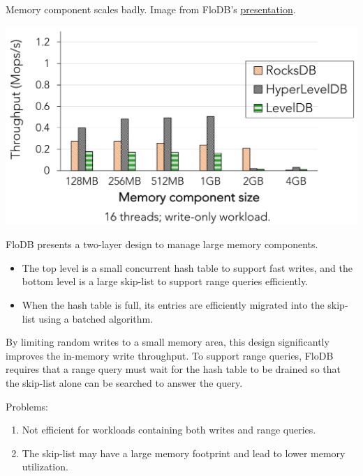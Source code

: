 \documentclass[11pt]{article}
\begin{document}
Memory component scales badly. Image from FloDB's \href{https://pdfs.semanticscholar.org/ad61/262bd300e6e645b1a97bc657309e3f56df2c.pdf}{presentation}.
\begin{center}
\includegraphics[width=.8\textwidth]{../../images/db/10.png}
\label{}
\end{center}

FloDB presents a two-layer design to manage large memory components.
\begin{itemize}
\item The top level is a small concurrent hash table to support fast writes, and the bottom level is a
large skip-list to support range queries efficiently.
\item When the hash table is full, its entries are efficiently migrated into the skip-list using a batched
algorithm.
\end{itemize}
By limiting random writes to a small memory area, this design significantly improves the in-memory
write throughput. To support range queries, FloDB requires that a range query must wait for the hash
table to be drained so that the skip-list alone can be searched to answer the query.

Problems:
\begin{enumerate}
\item Not efficient for workloads containing both writes and range queries.
\item The skip-list may have a large memory footprint and lead to lower memory utilization.
\end{enumerate}
\end{document}
